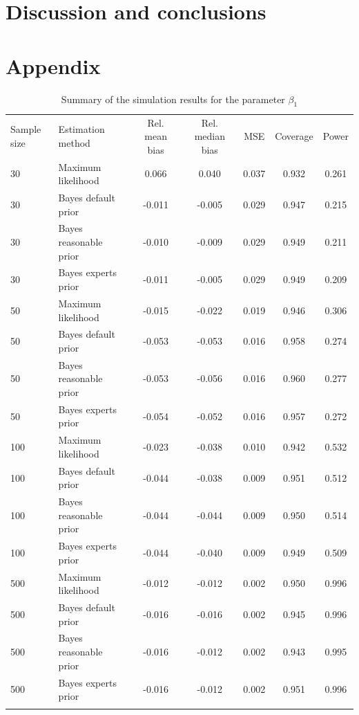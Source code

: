 \documentclass[graybox]{svmult}
\begin{document}
\section{Discussion and conclusions}

\label{sec:dicussion}

\clearpage

\section*{Appendix}
\label{sec: apendix}


\begin{table}
\caption{Summary of the simulation results for the parameter $\beta_1$}
\label{tab:}
\begin{tabular}[t]{llccccc}
\hline\noalign{\smallskip}
Sample size & Estimation method & Rel. mean bias & Rel. median bias & MSE & Coverage & Power\\
\noalign{\smallskip}\svhline\noalign{\smallskip}
30 & Maximum likelihood & 0.066 & 0.040 & 0.037 & 0.932 & 0.261\\
30 & Bayes default prior & -0.011 & -0.005 & 0.029 & 0.947 & 0.215\\
30 & Bayes reasonable prior & -0.010 & -0.009 & 0.029 & 0.949 & 0.211\\
30 & Bayes experts prior & -0.011 & -0.005 & 0.029 & 0.949 & 0.209\\
\noalign{\smallskip}
50 & Maximum likelihood & -0.015 & -0.022 & 0.019 & 0.946 & 0.306\\
50 & Bayes default prior & -0.053 & -0.053 & 0.016 & 0.958 & 0.274\\
50 & Bayes reasonable prior & -0.053 & -0.056 & 0.016 & 0.960 & 0.277\\
50 & Bayes experts prior & -0.054 & -0.052 & 0.016 & 0.957 & 0.272\\
\noalign{\smallskip}
100 & Maximum likelihood & -0.023 & -0.038 & 0.010 & 0.942 & 0.532\\
100 & Bayes default prior & -0.044 & -0.038 & 0.009 & 0.951 & 0.512\\
100 & Bayes reasonable prior & -0.044 & -0.044 & 0.009 & 0.950 & 0.514\\
100 & Bayes experts prior & -0.044 & -0.040 & 0.009 & 0.949 & 0.509\\
\noalign{\smallskip}
500 & Maximum likelihood & -0.012 & -0.012 & 0.002 & 0.950 & 0.996\\
500 & Bayes default prior & -0.016 & -0.016 & 0.002 & 0.945 & 0.996\\
500 & Bayes reasonable prior & -0.016 & -0.012 & 0.002 & 0.943 & 0.995\\
500 & Bayes experts prior & -0.016 & -0.012 & 0.002 & 0.951 & 0.996\\
\noalign{\smallskip}\hline\noalign{\smallskip}
\end{tabular}
\end{table}
\end{document}
